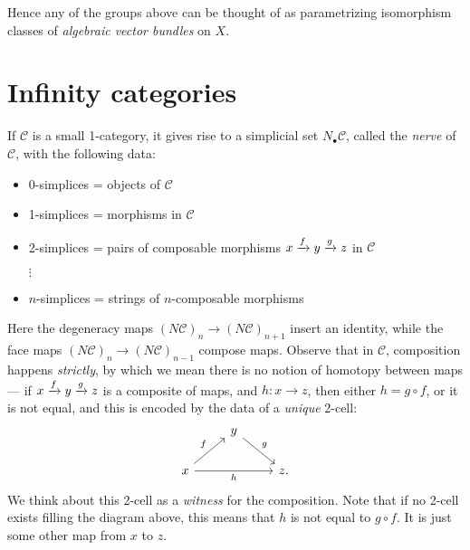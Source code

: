 \documentclass[11pt]{amsart}
\begin{document}
Hence any of the groups above can be thought of as parametrizing isomorphism classes of \textit{algebraic vector bundles} on $X$.





\section{\sectionheader Infinity categories}

\begin{example} If $\mathscr{C}$ is a small 1-category, it gives rise to a simplicial set $N_\bullet \mathscr{C}$, called the \textit{nerve} of $\mathscr{C}$, with the following data:
\begin{itemize}
    \item 0-simplices = objects of $\mathscr{C}$
    \item 1-simplices = morphisms in $\mathscr{C}$
    \item 2-simplices = pairs of composable morphisms $x \xrightarrow{f} y \xrightarrow{g} z$ in $\mathscr{C}$
    \item[$\vdots$]
    \item $n$-simplices = strings of $n$-composable morphisms
\end{itemize}
Here the degeneracy maps $(N\mathscr{C})_n \to (N\mathscr{C})_{n+1}$ insert an identity, while the face maps $(N\mathscr{C})_n \to (N\mathscr{C})_{n-1}$ compose maps. Observe that in $\mathscr{C}$, composition happens \textit{strictly}, by which we mean there is no notion of homotopy between maps --- if $x \xrightarrow{f} y \xrightarrow{g} z$ is a composite of maps, and $h \colon x \to z$, then either $h = g\circ f$, or it is not equal, and this is encoded by the data of a \textit{unique} 2-cell:
\[ \begin{tikzcd}
     & y\ar[dr,"g" above right]\\
    x\ar[ur,"f" above left]\ar[rr,"h" below] &  & z.
\end{tikzcd} \]
We think about this 2-cell as a \textit{witness} for the composition. Note that if no 2-cell exists filling the diagram above, this means that $h$ is not equal to $g\circ f$. It is just some other map from $x$ to $z$.
\end{example}
\end{document}
